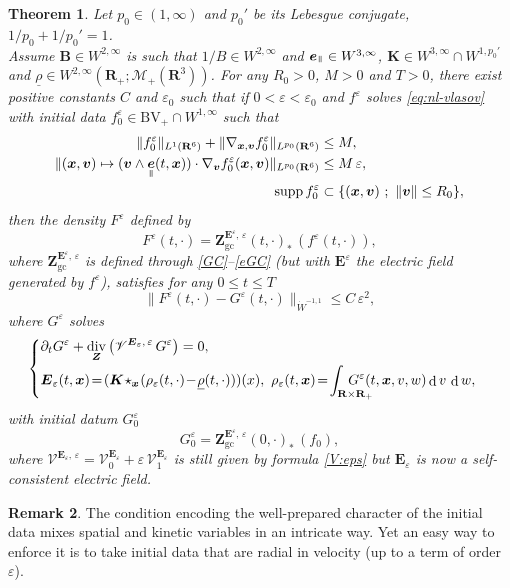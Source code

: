 \documentclass[10pt]{amsart}
\let\mathcal\mathscr
\newenvironment{splitcases}
{\begin{cases}\begin{aligned}}
{\end{aligned}\end{cases}}
\newcommand{\sep}{\ ;\ }
\newcommand{\BV}{\mathrm{BV}}
\let\eps\varepsilon
\let\d\partial
\DeclareMathOperator\dD{d}\let\dd\dD
\DeclareMathOperator{\Div}{div}
\theoremstyle{plain}
\newtheorem{theorem}{Theorem}[section]
\theoremstyle{definition}
\newtheorem{remark}[theorem]{Remark}
\newcommand\br{\begin{remark}}
\newcommand\er{\end{remark}}
\newcommand{\be}{\begin{equation}}
\newcommand{\ee}{\end{equation}}
\newcommand{\bt}{\begin{theorem}}
\newcommand{\et}{\end{theorem}}
\newcommand\R{\mathbf R}
\newcommand\bB{{\boldsymbol B}}
\newcommand\bE{{\boldsymbol E}}
\newcommand\bK{{\boldsymbol K}}
\newcommand\bZ{{\boldsymbol Z}}
\newcommand\bfv{{\boldsymbol v}}
\newcommand\bfx{{\boldsymbol x}}
\newcommand\bfZ{{\boldsymbol Z}}
\newcommand\urho{{\underline \rho}}
\newcommand\cM{{\mathcal M}}
\newcommand\cV{{\mathcal V}}
\DeclareMathOperator{\beD}{\boldsymbol{e}}
\newcommand\eDpar{\beD_\mypar}
\newcommand{\ZGC}{\bfZ_\mathrm{gc}}
\newcommand{\mypar}{{\mkern3mu\vphantom{\perp}\vrule depth 0pt\mkern2mu\vrule depth 0pt\mkern3mu}}
\begin{document}
\bt
\label{th:2-nl}
Let $p_0\in(1,\infty)$ and $p_0'$ be its Lebesgue conjugate, $1/p_0+1/p_0'=1$.\\
Assume $\bB\in W^{2,\infty}$ is such that $1/B\in W^{2,\infty}$ and $\eDpar\in W^{3,\infty}$, $\bK\in W^{3,\infty}\cap W^{1,p_0'}$ and $\urho\in W^{2,\infty}(\R_+;\cM_+(\R^3))$. For any $R_0>0$, $M>0$ and $T>0$, there exist positive constants $C$ and $\eps_0$ such that if $0<\eps<\eps_0$ and $f^\eps$ solves \eqref{eq:nl-vlasov} with initial data $f_0^\eps\in \BV_+\cap W^{1,\infty}$ such that\enlargethispage{\baselineskip}%
\begin{align*}
\|f_0^\eps\|_{L^1(\R^6)}+\|\nabla_{\bfx,\bfv}f_0^\eps\|_{L^{p_0}(\R^6)}&\leq M,\\
\|(\bfx,\bfv)\mapsto (\bfv\wedge\eDpar(t,\bfx))\cdot\nabla_{\bfv}f_0^\eps(\bfx,\bfv)\|_{L^{p_0}(\R^6)}&\leq M\,\eps,\\
\operatorname{supp}f_0^\eps&\subset
\{(\bfx,\bfv)\sep \|\bfv\|\leq R_0\},
\end{align*}
then the density $F^\eps$ defined by
\[
F^\eps(t,\cdot)= \ZGC^{\bE^\eps,\,\eps}(t,\cdot)_* \,(f^\eps(t,\cdot)),
\]
where $\ZGC^{\bE^\eps,\,\eps}$ is defined through \eqref{GC}--\eqref{eGC} (but with $\bE^\eps$ the electric field generated by $f^\eps$), satisfies for any $0\leq t\leq T$
\[
\|F^\eps(t,\cdot)-G^\eps(t,\cdot)\|_{\dot{W}^{-1,1}}\leq C\,\eps^2,
\]
where $G^\eps$ solves
\be
\label{eq:2nd-nl}
\begin{splitcases}
&\d_t G^\eps+\Div_\bfZ \left(\cV^{\bE_\eps,\,\eps}\,G^\eps \right) =0,\\
&\bE_\eps(t,\bfx)\!=\!(\bK\!\star_{\bfx}\!(\rho_\eps(t,\cdot)\!-\!\urho(t,\cdot)))(x),\ 
\rho_\eps(t,\bfx)\!=\!\int_{\R\times\R_+}\hspace*{-7mm}G^\eps(t,\bfx,v,w)\dD v\,\dD w,
\end{splitcases}
\ee
with initial datum $G_{0}^\eps$
\be
\label{eq:2nd-nlG0}
G_{0}^\eps= \bZ_\mathrm{gc}^{\bE^\eps,\,\eps}(0,\cdot)_* \,(f_0),
\ee
where $\cV^{\bE_\eps,\,\eps}=\cV^{\bE_\eps}_0+\eps\,\cV^{\bE_\eps}_1$ is still given by formula \eqref{V:eps} but $\bE_\eps$ is now a self-consistent electric field.
\et

\br
The condition encoding the well-prepared character of the initial data mixes spatial and kinetic variables in an intricate way. Yet an easy way to enforce it is to take initial data that are radial in velocity (up to a term of order $\eps$).
\er
\end{document}
